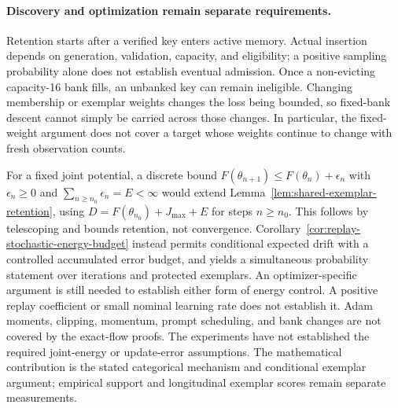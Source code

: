 \paragraph{Discovery and optimization remain separate requirements.}
Retention starts after a verified key enters active memory. Actual insertion
depends on generation, validation, capacity, and eligibility; a positive
sampling probability alone does not establish eventual admission. Once a
non-evicting capacity-16 bank fills, an unbanked key can remain ineligible.
Changing membership or exemplar weights changes the loss being bounded, so
fixed-bank descent cannot simply be carried across those changes. In
particular, the fixed-weight argument does not cover a target whose weights
continue to change with fresh observation counts.

For a fixed joint potential, a discrete bound
$F(\theta_{n+1})\le F(\theta_n)+\epsilon_n$ with
$\epsilon_n\ge0$ and $\sum_{n\ge n_0}\epsilon_n=E<\infty$ would extend
Lemma~\ref{lem:shared-exemplar-retention}, using
$D=F(\theta_{n_0})+J_{\max}+E$ for steps $n\ge n_0$.
This follows by telescoping and bounds retention, not convergence. Corollary~\ref{cor:replay-stochastic-energy-budget} instead permits
conditional expected drift with a controlled accumulated error budget,
and yields a simultaneous probability statement over iterations and
protected exemplars. An optimizer-specific argument is still needed to
establish either form of energy control. A positive replay coefficient or small nominal
learning rate does not establish it. Adam moments, clipping, momentum, prompt
scheduling, and bank changes are not covered by the exact-flow proofs.
The experiments have not established the required joint-energy or
update-error assumptions. The mathematical contribution is the stated
categorical mechanism and conditional exemplar argument; empirical support
and longitudinal exemplar scores remain separate measurements.


